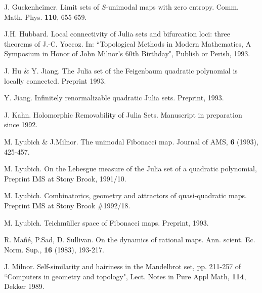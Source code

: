 {\item [G]} J. Guckenheimer. Limit sets of $S$-unimodal maps with zero
  entropy. Comm. Math. Phys. {\bf 110}, 655-659.\smallskip


{\item [H]} J.H. Hubbard.  Local connectivity of Julia sets and bifurcation
     loci: three theorems of J.-C. Yoccoz. In:
    ``Topological Methods in Modern Mathematics, A Symposium in
     Honor of John Milnor's 60th Birthday", Publish or Perish, 1993.\smallskip

{\item [HJ]} J. Hu \& Y. Jiang. The Julia set of the Feigenbaum quadratic
  polynomial is locally connected. Preprint 1993.\smallskip

{\item [J]} Y. Jiang. Infinitely renormalizable quadratic Julia sets.
  Preprint, 1993.\smallskip



{\item [K]} J. Kahn. Holomorphic Removability of Julia Sets. Manuscript in
  preparation since 1992.\smallskip

{\item [LM]} M. Lyubich \& J.Milnor. The unimodal Fibonacci map. 
         Journal of AMS, {\bf 6} (1993), 425-457. \smallskip


{\item [L1]} M. Lyubich. On the Lebesgue measure of the Julia set of a 
     quadratic polynomial, Preprint IMS at Stony Brook, 1991/10. \smallskip

{\item [L2]} M. Lyubich. Combinatorics, geometry and attractors of
     quasi-quadratic maps.    
     Preprint IMS  at Stony Brook \#1992/18.\smallskip

{\item [L3]} M. Lyubich. Teichm\"{u}ller space of Fibonacci maps.
  Preprint, 1993.\smallskip

{\item [MSS]} R. Ma\~{n}\'{e}, P.Sad, D. Sullivan. On the dynamics of rational
  maps. Ann. scient. Ec. Norm. Sup., {\bf 16}  (1983), 193-217.\smallskip

{\item [M1]} J. Milnor. Self-similarity and hairiness in the Mandelbrot set,
          pp. 211-257 of ``Computers in geometry and topology",
          Lect. Notes in Pure Appl Math, {\bf 114}, Dekker 1989.\smallskip

